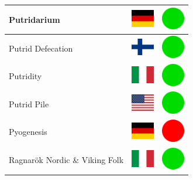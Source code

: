 \documentclass[12pt, a4paper, twoside]{report}
\begin{document}
\begin{center}
\begin{longtable}{|p{5cm}|p{2cm}|p{2cm}|}
 Putridarium                                                & \includegraphics[width=1cm]{../4x3/de} &   \includegraphics[width=1cm]{../likes/y} \\ \hline
 Putrid Defecation                                          & \includegraphics[width=1cm]{../4x3/fi} &   \includegraphics[width=1cm]{../likes/y} \\ \hline
 Putridity                                                  & \includegraphics[width=1cm]{../4x3/it} &   \includegraphics[width=1cm]{../likes/y} \\ \hline
 Putrid Pile                                                & \includegraphics[width=1cm]{../4x3/us} &   \includegraphics[width=1cm]{../likes/y} \\ \hline
 Pyogenesis                                                 & \includegraphics[width=1cm]{../4x3/de} &   \includegraphics[width=1cm]{../likes/n} \\ \hline
 Ragnarök Nordic \& Viking Folk                             & \includegraphics[width=1cm]{../4x3/it} &   \includegraphics[width=1cm]{../likes/y} \\ \hline

\end{longtable}
\end{center}
\end{document}
